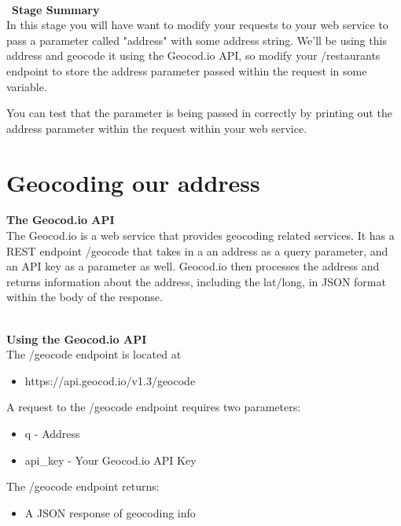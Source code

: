 \documentclass{article}
\newenvironment{info}[1][Info:]{ %
	\medskip
	\begin{mdframed}[style=info]
		\noindent{\textbf{#1}}
}{
	\end{mdframed}
}
\begin{document}
\-\\\ 
\textbf{Stage Summary}\\
In this stage you will have want to modify your requests to your web service to pass a parameter called "address" with some address string. We'll be using this address and geocode it using the Geocod.io API, so modify your /restaurants endpoint to store the address parameter passed within the request in some variable. 

\begin{info}[Hint:]
You can test that the parameter is being passed in correctly by printing out the address parameter within the request within your web service. 
\end{info}


\section{Geocoding our address}

\textbf{The Geocod.io API}\\
The Geocod.io is a web service that provides geocoding related services. It has a REST endpoint /geocode that takes in a an address as a query parameter, and an API key as a parameter as well. Geocod.io then processes the address and returns information about the address, including the lat/long, in JSON format within the body of the response. 

\-\ \\
\textbf{Using the Geocod.io API}\\
The /geocode endpoint is located at
\begin{itemize}
\item https://api.geocod.io/v1.3/geocode
\end{itemize}
A request to the /geocode endpoint requires two parameters:
\begin{itemize}
\item q - Address
\item api\_key - Your Geocod.io API Key
\end{itemize}
The /geocode endpoint returns:
\begin{itemize}
\item A JSON response of geocoding info
\end{itemize}
\end{document}
